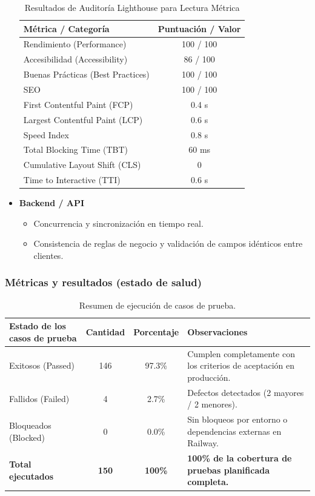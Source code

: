 \documentclass[12pt, atypical, journal]{article}
\begin{document}
\begin{itemize}
\begin{table}[h!]
    \centering
    \caption{Resultados de Auditoría Lighthouse para Lectura Métrica}
    \begin{tabular}{|l|c|}
        \hline
        \textbf{Métrica / Categoría} & \textbf{Puntuación / Valor} \\ \hline
        Rendimiento (Performance) & 100 / 100 \\ \hline
        Accesibilidad (Accessibility) & 86 / 100 \\ \hline
        Buenas Prácticas (Best Practices) & 100 / 100 \\ \hline
        SEO & 100 / 100 \\ \hline
        First Contentful Paint (FCP) & 0.4 s \\ \hline
        Largest Contentful Paint (LCP) & 0.6 s \\ \hline
        Speed Index & 0.8 s \\ \hline
        Total Blocking Time (TBT) & 60 ms \\ \hline
        Cumulative Layout Shift (CLS) & 0 \\ \hline
        Time to Interactive (TTI) & 0.6 s \\ \hline
    \end{tabular}
    \label{tab:lighthouse-metrics}
\end{table}
    \item \textbf{Backend / API}
    \begin{itemize}
        \item Concurrencia y sincronización en tiempo real.
        \item Consistencia de reglas de negocio y validación de campos idénticos entre clientes.
    \end{itemize}
\end{itemize}

\subsubsection{Métricas y resultados (estado de salud)}
\begin{table}[H]
\centering
\small
\renewcommand{\arraystretch}{1.2}
\begin{tabular}{|l|c|c|p{5.5cm}|}
\hline
\textbf{Estado de los casos de prueba} & \textbf{Cantidad} & \textbf{Porcentaje} & \textbf{Observaciones} \\ \hline
Exitosos (Passed) & 146 & 97.3\% & Cumplen completamente con los criterios de aceptación en producción. \\ \hline
Fallidos (Failed) & 4 & 2.7\% & Defectos detectados (2 mayores / 2 menores). \\ \hline
Bloqueados (Blocked) & 0 & 0.0\% & Sin bloqueos por entorno o dependencias externas en Railway. \\ \hline
\textbf{Total ejecutados} & \textbf{150} & \textbf{100\%} & \textbf{100\% de la cobertura de pruebas planificada completa.} \\ \hline
\end{tabular}
\caption{Resumen de ejecución de casos de prueba.}
\label{tab:qa_resultados}
\end{table}
\end{document}

